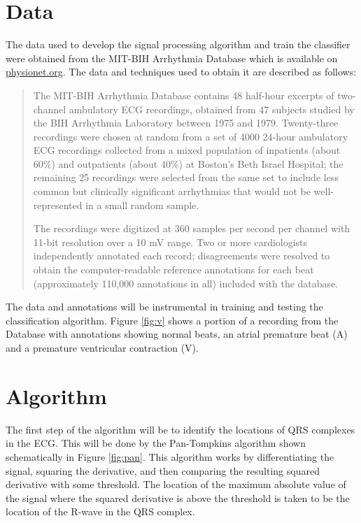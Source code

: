 \documentclass[12pt,letter]{article}
\begin{document}
\section{Data}
The data used to develop the signal processing algorithm and train the
classifier were obtained from the MIT-BIH Arrhythmia Database which is available
on \url{physionet.org}.  The data and techniques used to obtain it are described
as follows: 
\begin{quotation}
     The MIT-BIH Arrhythmia Database contains 48 half-hour excerpts of
     two-channel ambulatory ECG recordings, obtained from 47 subjects studied by
     the BIH Arrhythmia Laboratory between 1975 and 1979. Twenty-three
     recordings were chosen at random from a set of 4000 24-hour ambulatory ECG
     recordings collected from a mixed population of inpatients (about 60\%) and
     outpatients (about 40\%) at Boston's Beth Israel Hospital; the remaining 25
     recordings were selected from the same set to include less common but
     clinically significant arrhythmias that would not be well-represented in a
     small random sample.

     The recordings were digitized at 360 samples per second per channel with
     11-bit resolution over a 10 mV range. Two or more cardiologists
     independently annotated each record; disagreements were resolved to obtain
     the computer-readable reference annotations for each beat (approximately
     110,000 annotations in all) included with the database.
\end{quotation}

The data and annotations will be instrumental in training and testing the
classification algorithm.  Figure \ref{fig:v} shows a portion of a recording
from the Database with annotations showing normal beats, an atrial premature
beat (A) and a premature ventricular contraction (V).  

\section{Algorithm}
The first step of the algorithm will be to identify the locations of QRS
complexes in the ECG.  This will be done by the Pan-Tompkins algorithm shown
schematically in Figure \ref{fig:pan}.  This algorithm works by differentiating
the signal, squaring the derivative, and then comparing the resulting squared
derivative with some threshold.  The location of the maximum absolute value of
the signal where the squared derivative is above the threshold is taken to be
the location of the R-wave in the QRS complex.  
\end{document}
